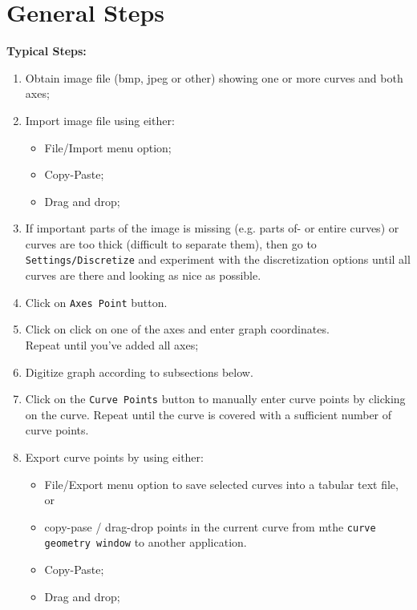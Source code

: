 \documentclass[norsk]{article} %
\numberwithin{equation}{section} %
\numberwithin{figure}{section} %
\numberwithin{table}{section} %
\begin{document}
\section{General Steps}
\textbf{Typical Steps:}
\begin{enumerate}
   \item Obtain image file (bmp, jpeg or other) showing one or more curves and both axes;
   \item Import image file using either:
      \begin{itemize}
         \item File/Import menu option;
         \item Copy-Paste;
         \item Drag and drop;
      \end{itemize}
   \item If important parts of the image is missing (e.g. parts of- or entire curves) or 
      curves are too thick (difficult to separate them),
      then go to \texttt{Settings/Discretize} and experiment with the discretization options
      until all curves are there and looking as nice as possible.
   \item Click on \texttt{Axes Point} button. 
   \item Click on click on one of the axes and enter graph coordinates.\\
         Repeat until you've added all axes;


      \item Digitize graph according to subsections below.


   \item Click on the \texttt{Curve Points} button to manually enter curve points by 
      clicking on the curve. Repeat until the curve is covered with a sufficient number of curve points.
   \item Export curve points by using either: 
      \begin{itemize}
         \item File/Export menu option to save selected curves into a tabular text file, or
         \item copy-pase / drag-drop points in the current curve from mthe \texttt{curve geometry window}
               to another application.
         \item Copy-Paste;
         \item Drag and drop;
      \end{itemize}
\end{enumerate}
\end{document}
